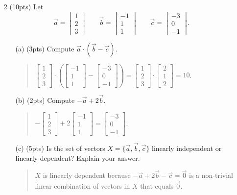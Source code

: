 \documentclass{article}
\newcommand{\mat}[1]{\begin{bmatrix}#1\end{bmatrix}}
\begin{document}
\begin{enumerate}
	\item[2 (10pts)] Let
		\[
			\vec a = \mat{1\\2\\3}\qquad \vec b=\mat{-1\\1\\1}\qquad \vec c=\mat{-3\\0\\-1}.
		\]
	\begin{enumerate}
		\item[(a) (3pts)] Compute $\vec a\cdot(\vec b-\vec c)$.
			\begin{quote}
				$\mat{1\\2\\3}\cdot \left(\mat{-1\\1\\1}-\mat{-3\\0\\-1}\right)=
				\mat{1\\2\\3}\cdot \mat{2\\1\\2}=10$.
			\end{quote}
		\vspace{.5in}
		\item[(b) (2pts)] Compute $-\vec a+2\vec b$.
			\begin{quote}
				$-\mat{1\\2\\3}+2\mat{-1\\1\\1}=\mat{-3\\0\\-1}$.
			\end{quote}
		\vspace{.5in}
		\item[(c) (5pts)] Is the set of vectors $X=\{\vec a,\vec b,\vec c\}$ linearly independent or linearly dependent?  Explain your
		answer.
			\begin{quote}
				$X$ is linearly dependent because $-\vec a+2\vec b-\vec c=\vec 0$ is a non-trivial linear combination of vectors
				in $X$ that equals $\vec 0$.
			\end{quote}
		\vspace{1in}
		
	
	\end{enumerate}
	\clearpage
	

\end{enumerate}
\end{document}
